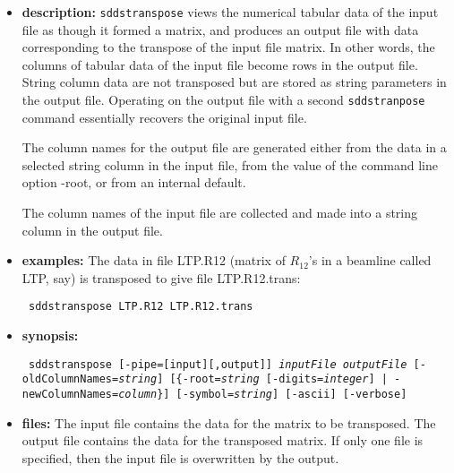 \begin{itemize}
\item {\bf description:}
%
%
\verb+sddstranspose+ views the numerical tabular data of the input file
as though it formed a matrix, and produces an output
file with data corresponding to the transpose of the input
file matrix. In other words, the columns of tabular data of the input
file become rows in the output file. String column data
are not transposed but are stored as string parameters in the output file.
Operating on the output file with a second \verb+sddstranpose+ command essentially recovers
the original input file.

The column names for the output file are generated either from the data in
a selected string column in the input file,
from the value of the command line option -root,
or from an internal default.

The column names of the input file are collected and made into
a string column in the output file.

\item {\bf examples:} 
%
% 
%
The data in file LTP.R12 (matrix of $R_{12}$'s in a beamline called LTP, say)
is transposed to give file LTP.R12.trans:
\begin{flushleft}{\tt
sddstranspose LTP.R12 LTP.R12.trans
}\end{flushleft}
\item {\bf synopsis:} 
%
%
\begin{flushleft}{\tt
sddstranspose [-pipe=[input][,output]] {\em inputFile} {\em outputFile}
     [-oldColumnNames={\em string}] [\{-root={\em string} [-digits={\em integer}] | 
     -newColumnNames={\em column}\}] 
     [-symbol={\em string}] [-ascii] [-verbose]
}\end{flushleft}
\item {\bf files:}
The input file contains the data for the matrix to be transposed. The output file
contains the data for the transposed matrix. If only one file is specified,
then the input file is overwritten by the output.



\end{itemize}
